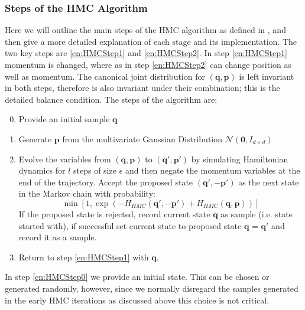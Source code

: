 \documentclass[12pt]{article}
\begin{document}
            \subsubsection{Steps of the HMC Algorithm}
            Here we will outline the main steps of the HMC algorithm as defined in \cite{duane_kennedy_pendleton_roweth_1987}, \cite{kennedy_pendleton_2001} and \cite{neal_2011} then give a more detailed explanation of each stage and its implementation. The two key steps are \ref{en:HMCStep1} and \ref{en:HMCStep2}. In step \ref{en:HMCStep1} momentum is changed, where as in step \ref{en:HMCStep2} can change position as well as momentum. The canonical joint distribution for $\left(\bm{q},\bm{p}\right)$ is left invariant in both steps, therefore is also invariant under their combination; this is the detailed balance condition. The steps of the algorithm are:
            \begin{enumerate}
                \setcounter{enumi}{-1}
                \item \label{en:HMCStep0} Provide an initial sample $\bm{q}$
                \item \label{en:HMCStep1} Generate $\bm{p}$ from the multivariate Gaussian Distribution $\mathcal{N}\left(\bm{0},I_{d\times d}\right)$ 
                \item \label{en:HMCStep2} Evolve the variables from $\left(\bm{q},\bm{p}\right)$ to $\left(\bm{q}',\bm{p}'\right)$ by simulating Hamiltonian dynamics for $l$ steps of size $\epsilon$ and then negate the momentum variables at the end of the trajectory. Accept the proposed state $\left(\bm{q}',-\bm{p}'\right)$ as the next state in the Markov chain with probability:
                        \begin{equation*}
                            \min{\left[1,\exp{\left(-H_{HMC}\left(\bm{q}',-\bm{p}'\right)+ \allowbreak H_{HMC}\left(\bm{q},\bm{p}\right)\right)}\right]}
                        \end{equation*}
                        If the proposed state is rejected, record current state $\bm{q}$ as sample (i.e. state started with), if successful set current state to proposed state $\bm{q}$ = $\bm{q}'$ and record it as a sample.
                \item \label{en:HMCStep5} Return to step \ref{en:HMCStep1} with $\bm{q}$.
            \end{enumerate}

            In step \ref{en:HMCStep0} we provide an initial state. This can be chosen or generated randomly, however, since we normally disregard the samples generated in the early HMC iterations as discussed above this choice is not critical. 
\end{document}
